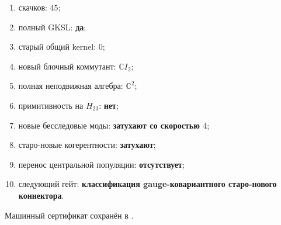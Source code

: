 \begin{protocol}\begin{enumerate}
\item скачков: \textbf{$45$};
\item полный GKSL: \textbf{да};
\item старый общий kernel: \textbf{$0$};
\item новый блочный коммутант: \textbf{$\mathbb C I_2$};
\item полная неподвижная алгебра: \textbf{$\mathbb C^2$};
\item примитивность на $H_{23}$: \textbf{нет};
\item новые бесследовые моды: \textbf{затухают со скоростью $4$};
\item старо-новые когерентности: \textbf{затухают};
\item перенос центральной популяции: \textbf{отсутствует};
\item следующий гейт: \textbf{классификация gauge-ковариантного
старо-нового коннектора}.
\end{enumerate}\end{protocol}

Машинный сертификат сохранён в
.